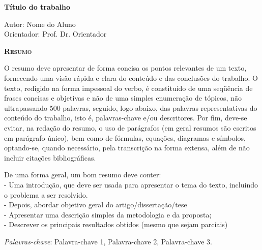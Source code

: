 \begin{center}
	{\Large{\textbf{Título do trabalho}}}
\end{center}

\vspace{1cm}

\begin{flushright}
	Autor: Nome do Aluno\\
	Orientador: Prof. Dr. Orientador\\ 
\end{flushright}

\vspace{1cm}

\begin{center}
	\Large{\textsc{\textbf{Resumo}}}
\end{center}

\noindent O resumo deve apresentar de forma concisa os pontos relevantes de um texto, fornecendo uma visão rápida e clara do conteúdo e das conclusões do trabalho. O texto, redigido na forma impessoal do verbo, é constituído de uma seqüência de frases concisas e objetivas e não de uma simples enumeração de tópicos, não ultrapassando 500 palavras, seguido, logo abaixo, das palavras representativas do conteúdo do trabalho, isto é, palavras-chave e/ou descritores. Por fim, deve-se evitar, na redação do resumo, o uso de parágrafos (em geral resumos são escritos em parágrafo único), bem como de fórmulas, equações, diagramas e símbolos, optando-se, quando necessário, pela transcrição na forma extensa, além de não incluir citações bibliográficas.

\noindent De uma forma geral, um bom resumo deve conter: \\
- Uma introdução, que deve ser usada para apresentar o tema do texto, incluindo o problema a ser resolvido. \\
- Depois, abordar objetivo geral do artigo/dissertação/tese\\
- Apresentar uma descrição simples da metodologia e da proposta; \\
- Descrever os principais resultados obtidos (mesmo que sejam parciais)

\noindent\textit{Palavras-chave}: Palavra-chave 1, Palavra-chave 2, Palavra-chave 3.
